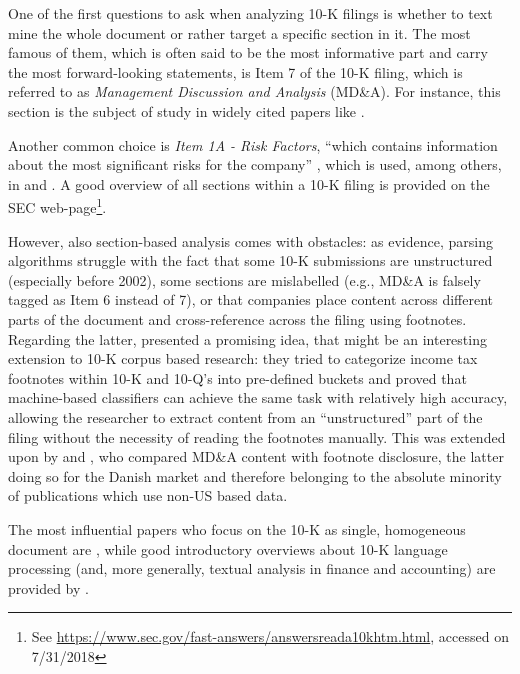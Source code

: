 One of the first questions to ask when analyzing 10-K filings is whether to text mine the whole document or rather target a specific section in it. The most famous of them, which is often said to be the most informative part and carry the most forward-looking statements, is Item 7 of the 10-K filing, which is referred to as \textit{Management Discussion and Analysis} (MD\&A). For instance, this section is the subject of study in widely cited papers like \textcite{Kogan2009_1, Li2010, Feldman_et_al_2010, TsaiWang2012, WangTsaiLiuChang2013, TsaiWang2013, TsaiWangChien2016, TsaiWang2016}. 

Another common choice is \textit{Item 1A - Risk Factors}, \enquote{which contains information about the most significant risks for the company} \parencite[1712]{Rekabsaz2017}, which is used, among others, in \textcite{HuangLi2011} and \textcite{Rekabsaz2017}. A good overview of all sections within a 10-K filing is provided on the SEC web-page\footnote{See \url{https://www.sec.gov/fast-answers/answersreada10khtm.html}, accessed on 7/31/2018}.  

However, also section-based analysis comes with obstacles: as \textcite{LM-meta-2016} evidence, parsing algorithms struggle with the fact that some 10-K submissions are unstructured (especially before 2002), some sections are mislabelled (e.g., MD\&A is falsely tagged as Item 6 instead of 7), or that companies place content across different parts of the document and cross-reference across the filing using footnotes. Regarding the latter, \textcite{HeidariFelden_Footnotes_2015} presented a promising idea, that might be an interesting extension to 10-K corpus based research: they tried to categorize income tax footnotes within 10-K and 10-Q's into pre-defined buckets and proved that machine-based classifiers can achieve the same task with relatively high accuracy, allowing the researcher to extract content from an \enquote{unstructured} part of the filing without the necessity of reading the footnotes manually. This was extended upon by \textcite{Amel-Zadeh_Faasse_2016} and \textcite{ThinggaardJeppersenMadsen2016}, who compared MD\&A content with footnote disclosure, the latter doing so for the Danish market and therefore belonging to the absolute minority of publications which use non-US based data.

The most influential papers who focus on the 10-K as single, homogeneous document are \textcite{KothariLiShort_2009, LehavyLiMerkley2011, Loughran2011, Loughran2014, LM-meta-2016}, while good introductory overviews about 10-K language processing (and, more generally, textual analysis in finance and accounting) are provided by \textcite{Qiu07, Pulliza2015, LM-meta-2016}. 


\clearpage
